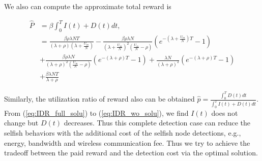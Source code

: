 We also can compute the approximate total reward is
\begin{small}
\begin{equation}
\nonumber
\begin{aligned}
\hat{P} &= \beta \int_{0}^{T} I(t) + D(t) dt, \\
& = \frac{\beta \rho \lambda N T}{ (\lambda + \rho)(\lambda + \frac{U_{m}}{N}) }
- \frac{\beta \rho \lambda N}{ {(\lambda + \frac{U_{m}}{N})}^{2} (\frac{U_{m}}{N} - \rho)}
(e^{-(\lambda + \frac{U_{m}}{N})T} - 1 ) \\
&+ \frac{\beta \rho \lambda N }{ {(\lambda + \rho)}^{2} (\frac{U_{m}}{N} - \rho) }
(e^{-(\lambda + \rho)T} - 1 ) 
+ \frac{ \lambda N }{ (\lambda + \rho)^2 } (e^{-(\lambda + \rho)T} - 1 ) \\
& + \frac{ \beta \lambda N T }{ \lambda + \rho }
\end{aligned}
\end{equation}
\end{small}
Similarly, the utilization ratio of reward also can be obtained
$\hat{p} = \frac{\int_{0}^{T} D(t) dt}{\int_{0}^{T} I(t) + D(t) dt}$.
From (\ref{eq:IDR_full_solu}) to (\ref{eq:IDR_wo_solu}),
we find $I(t)$ does not change but $D(t)$ decreases.
Thus this complete detection case can reduce the selfish behaviors
with the additional cost of the selfish node detections,
e.g., energy, bandwidth and wireless communication fee.
Thus we try to achieve the tradeoff between the paid reward and the detection cost
via the optimal solution.